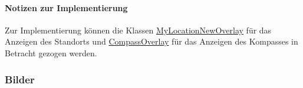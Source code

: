 \paragraph*{Notizen zur Implementierung}
Zur Implementierung können die Klassen \href{https://osmdroid.github.io/osmdroid/javadocs/osmdroid-android/debug/org/osmdroid/views/overlay/mylocation/MyLocationNewOverlay.html}
{MyLocationNewOverlay} für das Anzeigen des Standorts und \href{https://osmdroid.github.io/osmdroid/javadocs/osmdroid-android/debug/org/osmdroid/views/overlay/compass/CompassOverlay.html}
{CompassOverlay} für das Anzeigen des Kompasses in Betracht gezogen werden.

\subsubsection*{Bilder}\label{App_Map_View_MapScreen_Bilder}
\begin{minipage}{\linewidth}
    \centering
    \begin{minipage}{.49\textwidth}
        \captionsetup[figure]{labelformat=empty}
        \captionsetup[figure]{labelformat=default}
    \end{minipage}
    \begin{minipage}{.49\textwidth}
        \captionsetup[figure]{labelformat=empty}
        \captionsetup[figure]{labelformat=default}
    \end{minipage}
\end{minipage}

